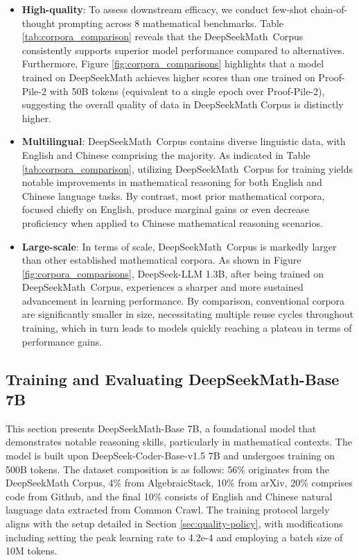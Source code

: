 \begin{itemize}[topsep=0pt]
\begin{itemize}[topsep=0pt]
    \item \textbf{High-quality}:
    To assess downstream efficacy, we conduct few-shot chain-of-thought prompting \cite{cot} across 8 mathematical benchmarks. Table \ref{tab:corpora_comparison} reveals that the DeepSeekMath~Corpus consistently supports superior model performance compared to alternatives. Furthermore, Figure \ref{fig:corpora_comparisons} highlights that a model trained on DeepSeekMath achieves higher scores than one trained on Proof-Pile-2 with 50B tokens (equivalent to a single epoch over Proof-Pile-2), suggesting the overall quality of data in DeepSeekMath Corpus is distinctly higher.
    \item \textbf{Multilingual}:
    DeepSeekMath~Corpus contains diverse linguistic data, with English and Chinese comprising the majority. As indicated in Table \ref{tab:corpora_comparison}, utilizing DeepSeekMath~Corpus for training yields notable improvements in mathematical reasoning for both English and Chinese language tasks. By contrast, most prior mathematical corpora, focused chiefly on English, produce marginal gains or even decrease proficiency when applied to Chinese mathematical reasoning scenarios.
    \item \textbf{Large-scale}:
    In terms of scale, DeepSeekMath~Corpus is markedly larger than other established mathematical corpora. As shown in Figure \ref{fig:corpora_comparisons}, DeepSeek-LLM 1.3B, after being trained on DeepSeekMath~Corpus, experiences a sharper and more sustained advancement in learning performance. By comparison, conventional corpora are significantly smaller in size, necessitating multiple reuse cycles throughout training, which in turn leads to models quickly reaching a plateau in terms of performance gains.
\end{itemize}

\subsection{Training and Evaluating DeepSeekMath-Base 7B}

This section presents DeepSeekMath-Base 7B, a foundational model that demonstrates notable reasoning skills, particularly in mathematical contexts. The model is built upon DeepSeek-Coder-Base-v1.5 7B \citep{deepseek-coder} and undergoes training on 500B tokens. The dataset composition is as follows: 56\% originates from the DeepSeekMath Corpus, 4\% from AlgebraicStack, 10\% from arXiv, 20\% comprises code from Github, and the final 10\% consists of English and Chinese natural language data extracted from Common Crawl. The training protocol largely aligns with the setup detailed in Section \ref{sec:quality-policy}, with modifications including setting the peak learning rate to 4.2e-4 and employing a batch size of 10M tokens.


\end{itemize}
